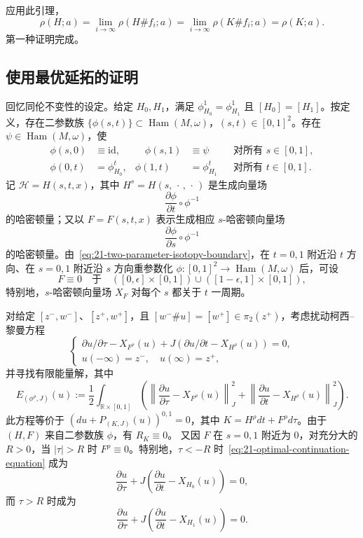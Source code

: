 应用此引理，
\[
 \rho(H;a)=\lim_{i\to\infty}\rho(H\#f_i;a)
 =\lim_{i\to\infty}\rho(K\#f_i;a)=\rho(K;a).
\]
第一种证明完成。

\subsection{使用最优延拓的证明}

回忆同伦不变性的设定。给定 $H_0,H_1$，满足
$\phi_{H_0}^1=\phi_{H_1}^1$ 且 $[H_0]=[H_1]$。按定义，存在二参数族
$\{\phi(s,t)\}\subset\operatorname{Ham}(M,\omega)$，$(s,t)\in[0,1]^2$。存在
$\psi\in\operatorname{Ham}(M,\omega)$，使
\begin{equation}
 \begin{aligned}
 \phi(s,0)&\equiv\mathrm{id},&\quad \phi(s,1)&\equiv\psi
 &&\text{对所有 }s\in[0,1],\\
 \phi(0,t)&=\phi_{H_0}^t,& \phi(1,t)&=\phi_{H_1}^t
 &&\text{对所有 }t\in[0,1].
 \end{aligned}
 \label{eq:21-two-parameter-isotopy-boundary}
\end{equation}
记 $\mathcal H=H(s,t,x)$，其中 $H^s=H(s,\,\cdot\,,\,\cdot\,)$ 是生成向量场
\[
 \frac{\partial\phi}{\partial t}\circ\phi^{-1}
\]
的哈密顿量；又以 $F=F(s,t,x)$ 表示生成相应 $s$-哈密顿向量场
\[
 \frac{\partial\phi}{\partial s}\circ\phi^{-1}
\]
的哈密顿量。由~\eqref{eq:21-two-parameter-isotopy-boundary}，在 $t=0,1$ 附近沿
$t$ 方向、在 $s=0,1$ 附近沿 $s$ 方向重参数化
$\phi:[0,1]^2\to\operatorname{Ham}(M,\omega)$ 后，可设
\[
 F\equiv0\quad\text{于}\quad
 ([0,\epsilon]\times[0,1])\cup([1-\epsilon,1]\times[0,1]),
\]
特别地，$s$-哈密顿向量场 $X_F$ 对每个 $s$ 都关于 $t$ 一周期。

对给定 $[z^-,w^-]$、$[z^+,w^+]$，且
$[w^-\#u]=[w^+]\in\pi_2(z^+)$，考虑扰动柯西--黎曼方程
\begin{equation}
 \begin{cases}
 \partial u/\partial\tau-X_{F^\rho}(u)
 +J(\partial u/\partial t-X_{H^\rho}(u))=0,\\
 u(-\infty)=z^-,\quad u(\infty)=z^+,
 \end{cases}
 \label{eq:21-optimal-continuation-equation}
\end{equation}
并寻找有限能量解，其中
\[
 E_{(\phi^\rho,J)}(u):=\frac12\int_{\mathbb R\times[0,1]}
 \left(
 \left\lVert\frac{\partial u}{\partial\tau}-X_{F^\rho}(u)\right\rVert_J^2
 +\left\lVert\frac{\partial u}{\partial t}-X_{H^\rho}(u)\right\rVert_J^2
 \right).
\]
此方程等价于 $(du+P_{(K,J)}(u))^{0,1}=0$，其中
$K=H^\rho dt+F^\rho d\tau$。由于 $(H,F)$ 来自二参数族 $\phi$，有 $R_K\equiv0$。
又因 $F$ 在 $s=0,1$ 附近为 $0$，对充分大的 $R>0$，当 $|\tau|>R$ 时
$F^\rho\equiv0$。特别地，$\tau<-R$ 时~\eqref{eq:21-optimal-continuation-equation}
成为
\[
 \frac{\partial u}{\partial\tau}
 +J\left(\frac{\partial u}{\partial t}-X_{H_0}(u)\right)=0,
\]
而 $\tau>R$ 时成为
\[
 \frac{\partial u}{\partial\tau}
 +J\left(\frac{\partial u}{\partial t}-X_{H_1}(u)\right)=0.
\]

